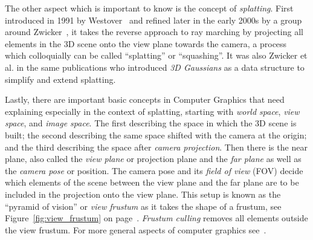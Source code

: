The other aspect which is important to know is the concept of \textit{splatting}. First introduced in 1991 by Westover~\cite{Westover1991SplattingAP} and refined later in the early 2000s by a group around Zwicker~\cite{zwickerEWAVolumeSplatting2001, zwickerSurfaceSplatting2001}, it takes the reverse approach to ray marching by projecting all elements in the 3D scene onto the view plane towards the camera, a process which colloquially can be called ``splatting'' or ``squashing''. 
It was also Zwicker et al. in the same publications who introduced \textit{3D Gaussians} as a data structure to simplify and extend splatting.

Lastly, there are important basic concepts in Computer Graphics that need explaining especially in the context of splatting, starting with \textit{world space}, \textit{view space}, and \textit{image space}. The first describing the space in which the 3D scene is built; the second describing the same space shifted with the camera at the origin; and the third describing the space after \textit{camera projection}.
Then there is the near plane, also called the \textit{view plane} or projection plane and the \textit{far plane} as well as the \textit{camera pose} or position. The camera pose and its \textit{field of view} (FOV) decide which elements of the scene between the view plane and the far plane are to be included in the projection onto the view plane.
This setup is known as the ``pyramid of vision'' or \textit{view frustum} as it takes the shape of a frustum, see Figure~\ref{fig:view_frustum} on page~\pageref{fig:view_frustum}. \textit{Frustum culling} removes all elements outside the view frustum. For more general aspects of computer graphics see~\cite{marschnerFundamentalsComputerGraphics2021}.